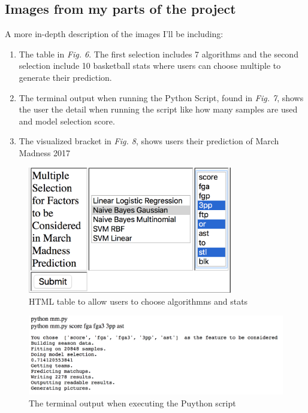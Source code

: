 \documentclass[onecolumn, draftclsnofoot,10pt, compsoc]{IEEEtran}
\begin{document}
\subsection{Images from my parts of the project}
A more in-depth description of the images I'll be including:

\begin{enumerate}
\item The table in \textit{Fig. 6}. The first selection includes 7 algorithms and the second selection include 10 basketball stats where users can choose multiple to generate their prediction.
\item The terminal output when running the Python Script, found in \textit{Fig. 7}, shows the user the detail when running the script like how many samples are used and model selection score.
\item The visualized bracket in \textit{Fig. 8}, shows users their prediction of March Madness 2017
\end{enumerate}  

\begin{figure}[H]
\centering
\includegraphics[width=0.8\textwidth]{images/table.png}
\caption{HTML table to allow users to choose algorithmns and stats}
\label{fig6}
\end{figure}

\begin{figure}[H]
\centering
\includegraphics[width=1\textwidth]{images/result.png}
\caption{The terminal output when executing the Puython script}
\label{fig7}
\end{figure}
\end{document}
